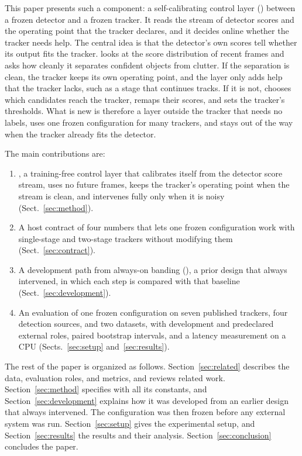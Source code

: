 This paper presents such a component: a self-calibrating control layer (\scl{})
between a frozen detector and a frozen tracker. It reads the stream of detector scores
and the operating point that the tracker declares, and it decides online
whether the tracker needs help. The central idea is that the detector's own
scores tell whether its output fits the tracker. \scl{} looks at the score
distribution of recent frames and asks how cleanly it separates confident
objects from clutter. If the separation is clean, the tracker keeps its own
operating point, and the layer only adds help that the tracker lacks, such as
a stage that continues tracks. If it is not, \scl{} chooses which candidates reach the
tracker, remaps their scores, and sets the tracker's thresholds. What is new
is therefore a layer outside the tracker that needs no labels, uses one frozen
configuration for many trackers, and stays out of the way when the tracker
already fits the detector.

The main contributions are:
\begin{enumerate}
\item \scl{}, a training-free control layer that calibrates itself from the detector
      score stream, uses no future frames, keeps the tracker's operating point
      when the stream is clean, and intervenes fully only when it is noisy
      (Sect.~\ref{sec:method}).
\item A host contract of four numbers that lets one frozen configuration work
      with single-stage and two-stage trackers
      without modifying them (Sect.~\ref{sec:contract}).
\item A development path from always-on banding (\aob{}), a prior design that
      always intervened, in which
      each step is compared with that baseline (Sect.~\ref{sec:development}).
\item An evaluation of one frozen configuration on seven published trackers,
      four detection sources, and two datasets, with development and
      predeclared external roles, paired bootstrap intervals, and a
      latency measurement on a CPU (Sects.~\ref{sec:setup}
      and~\ref{sec:results}).
\end{enumerate}

The rest of the paper is organized as follows. Section~\ref{sec:related}
describes the data, evaluation roles, and metrics, and reviews related work. Section~\ref{sec:method} specifies \scl{} with all its
constants, and Section~\ref{sec:development} explains how it was developed
from an earlier design that always intervened. The configuration was then
frozen before any external system was run.
Section~\ref{sec:setup} gives the experimental setup, and
Section~\ref{sec:results} the results and their analysis. Section~\ref{sec:conclusion} concludes the paper.
